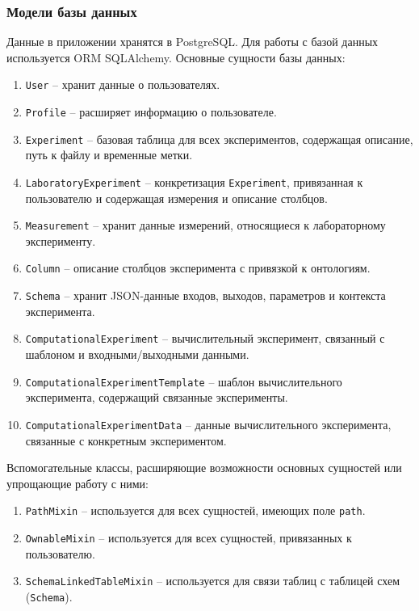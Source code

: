 
\subsubsection{Модели базы данных}\label{ORM models}

Данные в приложении хранятся в PostgreSQL. Для работы с базой данных используется ORM SQLAlchemy. Основные сущности базы данных:

\begin{enumerate}
    \item \texttt{User} -- хранит данные о пользователях.
    \item \texttt{Profile} -- расширяет информацию о пользователе.
    \item \texttt{Experiment} -- базовая таблица для всех экспериментов, содержащая описание, путь к файлу и временные метки.
    \item \texttt{LaboratoryExperiment} -- конкретизация \texttt{Experiment}, привязанная к пользователю и содержащая измерения и описание столбцов.
    \item \texttt{Measurement} -- хранит данные измерений, относящиеся к лабораторному эксперименту.
    \item \texttt{Column} -- описание столбцов эксперимента с привязкой к онтологиям.
    \item \texttt{Schema} -- хранит JSON-данные входов, выходов, параметров и контекста эксперимента.
    \item \texttt{ComputationalExperiment} -- вычислительный эксперимент, связанный с шаблоном и входными/выходными данными.
    \item \texttt{ComputationalExperimentTemplate} -- шаблон вычислительного эксперимента, содержащий связанные эксперименты.
    \item \texttt{ComputationalExperimentData} -- данные вычислительного эксперимента, связанные с конкретным экспериментом.
\end{enumerate}

Вспомогательные классы, расширяющие возможности основных сущностей или упрощающие работу с ними:

\begin{enumerate}
    \item \texttt{PathMixin} -- используется для всех сущностей, имеющих поле \texttt{path}.
    \item \texttt{OwnableMixin} -- используется для всех сущностей, привязанных к пользователю.
    \item \texttt{SchemaLinkedTableMixin} -- используется для связи таблиц с таблицей схем (\texttt{Schema}).
\end{enumerate}

